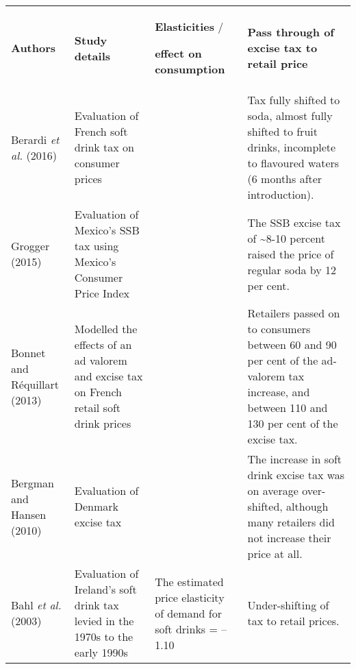\bgroup
\def\arraystretch{1.5}
\begin{tabularx}{\textwidth}{Xp{5cm}p{5cm}p{10cm}}
\toprule
\textbf{Authors} & \textbf{Study details} & \multicolumn{1}{p{5cm}}{\textbf{Elasticities} / 

\textbf{effect on consumption}} & \textbf{Pass through of excise tax to retail price} \\
\cmidrule(lr){1-4}
Berardi \emph{et al.} (2016) & Evaluation of French soft drink tax on consumer prices & & Tax fully shifted to soda, almost fully shifted to fruit drinks, incomplete to flavoured waters (6 months after introduction). \\
Grogger (2015) & Evaluation of Mexico's SSB tax using Mexico's Consumer Price Index & & The SSB excise tax of \textasciitilde{}8-10 percent raised the price of regular soda by 12 per cent. \\
Bonnet and R\'equillart (2013) & Modelled the effects of an ad valorem and excise tax on French retail soft drink prices & & Retailers passed on to consumers between 60 and 90 per cent of the ad-valorem tax increase, and between 110 and 130 per cent of the excise tax. \\
Bergman and Hansen (2010) & Evaluation of Denmark excise tax & & The increase in soft drink excise tax was on average over-shifted, although many retailers did not increase their price at all. \\
Bahl \emph{et al.} (2003) & Evaluation of Ireland's soft drink tax levied in the 1970s to the early 1990s & The estimated price elasticity of demand for soft drinks = --1.10 & Under-shifting of tax to retail prices. \\
\bottomrule
\end{tabularx}
\egroup